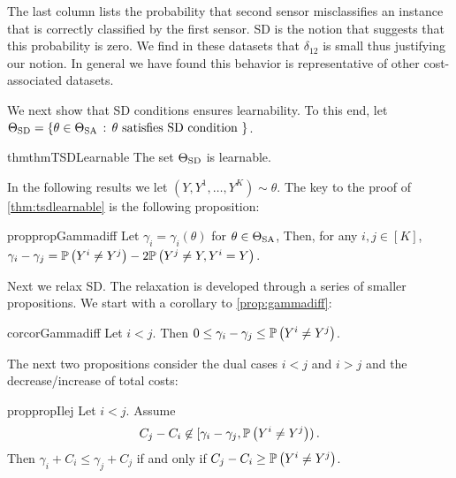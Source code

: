 The last column lists the probability that second sensor misclassifies an instance that is correctly classified by the first sensor. SD is the notion that suggests that this probability is zero. We find in these datasets that $\delta_{12}$ is small thus justifying our notion. In general we have found this behavior is representative of other cost-associated datasets. %



We next show that SD conditions ensures learnability. To this end,
let $\Theta_{\mathrm{SD}} = \{ \theta\in \Theta_{\mathrm{SA}}\,:\, \theta \text{ satisfies SD condition } \}$.

\begin{restatable}{thm}{thmTSDLearnable}
\label{thm:tsdlearnable}
The set $\Theta_{\mathrm{SD}}$ is learnable.
\end{restatable}
In the following results we let $(Y,Y^1,\dots,Y^K) \sim \theta$.
The key to the proof of \cref{thm:tsdlearnable} is the following proposition:
\begin{restatable}{prop}{propGammadiff}
\label{prop:gammadiff}
Let $\gamma_i = \gamma_i(\theta)$ for $\theta \in \Theta_{\mathrm{SA}}$, 
Then, for any $i,j\in [K]$, $\gamma_i - \gamma_j = \mathbb{P}\left(Y^i\ne Y^j\right) - 2\mathbb{P}\left( Y^j \ne Y, Y^i=Y\right)$.
\end{restatable}
Next we relax SD. The relaxation is developed 
through a series of smaller
propositions. 
We start with a corollary to \cref{prop:gammadiff}:
\begin{restatable}{cor}{corGammadiff}
\label{cor:gammadiff}
Let $i<j$. Then $0\le \gamma_i -\gamma_j \le \mathbb{P}\left(Y^i\ne Y^j\right)$.
\end{restatable}
The next two propositions consider the dual cases $i<j$ and $i>j$
and the decrease/increase of total costs:
\begin{restatable}{prop}{propIlej}
\label{prop:ilej}
Let $i<j$. Assume 
\begin{align}
\label{eq:cond1}
C_j - C_i \not\in [\gamma_i - \gamma_j, \mathbb{P}\left(Y^i\ne Y^j\right) )\,.
\end{align}
Then $\gamma_i + C_i \le \gamma_j + C_j$ if and only if $C_j - C_i \ge \mathbb{P}\left(Y^i\ne Y^j\right)$.
\end{restatable}

